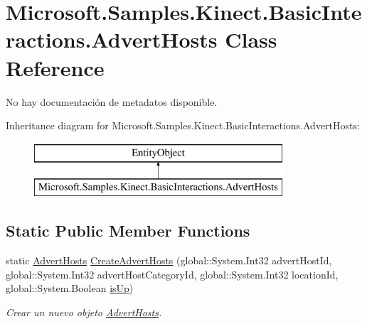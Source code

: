 \hypertarget{class_microsoft_1_1_samples_1_1_kinect_1_1_basic_interactions_1_1_advert_hosts}{\section{Microsoft.\-Samples.\-Kinect.\-Basic\-Interactions.\-Advert\-Hosts Class Reference}
\label{class_microsoft_1_1_samples_1_1_kinect_1_1_basic_interactions_1_1_advert_hosts}
}


No hay documentación de metadatos disponible.  


Inheritance diagram for Microsoft.\-Samples.\-Kinect.\-Basic\-Interactions.\-Advert\-Hosts\-:\begin{figure}[H]
\begin{center}
\leavevmode
\includegraphics[height=2.000000cm]{class_microsoft_1_1_samples_1_1_kinect_1_1_basic_interactions_1_1_advert_hosts}
\end{center}
\end{figure}
\subsection*{Static Public Member Functions}
\begin{DoxyCompactItemize}
\item 
static \hyperlink{class_microsoft_1_1_samples_1_1_kinect_1_1_basic_interactions_1_1_advert_hosts}{Advert\-Hosts} \hyperlink{class_microsoft_1_1_samples_1_1_kinect_1_1_basic_interactions_1_1_advert_hosts_a58843653e06086593eb837dc79c5218a}{Create\-Advert\-Hosts} (global\-::\-System.\-Int32 advert\-Host\-Id, global\-::\-System.\-Int32 advert\-Host\-Category\-Id, global\-::\-System.\-Int32 location\-Id, global\-::\-System.\-Boolean \hyperlink{class_microsoft_1_1_samples_1_1_kinect_1_1_basic_interactions_1_1_advert_hosts_a6f03490cfb61306c9ff66d8f7708fce5}{is\-Up})
\begin{DoxyCompactList}\small\item\em Crear un nuevo objeto \hyperlink{class_microsoft_1_1_samples_1_1_kinect_1_1_basic_interactions_1_1_advert_hosts}{Advert\-Hosts}. \end{DoxyCompactList}\end{DoxyCompactItemize}
